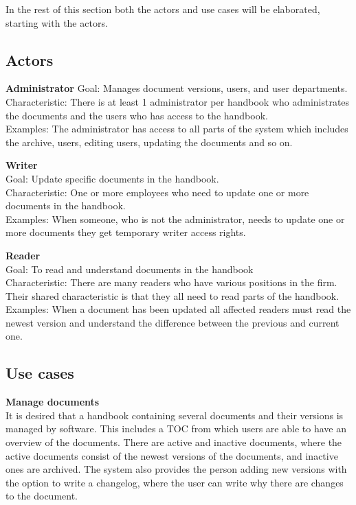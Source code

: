 In the rest of this section both the actors and use cases will be elaborated, starting with the actors.

\subsection{Actors}\label{sec:Actors}

\textbf{Administrator}
Goal: Manages document versions, users, and user departments.
\\
Characteristic: There is at least 1 administrator per handbook who administrates the documents and the users who has access to the handbook.
\\
Examples: The administrator has access to all parts of the system which includes the archive, users, editing users, updating the documents and so on.

\textbf{Writer}
\\
Goal: Update specific documents in the handbook.
\\
Characteristic: One or more employees who need to update one or more documents in the handbook.
\\
Examples: When someone, who is not the administrator, needs to update one or more documents they get temporary writer access rights.

\textbf{Reader}
\\
Goal: To read and understand documents in the handbook
\\
Characteristic: There are many readers who have various positions in the firm. Their shared characteristic is that they all need to read parts of the handbook.
\\
Examples: When a document has been updated all affected readers must read the newest version and understand the difference between the previous and current one.

\subsection{Use cases} \label{sec:usecases}
\textbf{Manage documents}
\\
It is desired that a handbook containing several documents and their versions is managed by software.
This includes a TOC from which users are able to have an overview of the documents.
There are active and inactive documents, where the active documents consist of the newest versions of the documents, and inactive ones are archived.
The system also provides the person adding new versions with the option to write a changelog, where the user can write why there are changes to the document.

